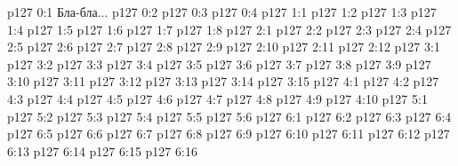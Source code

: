 \author{Промежуточные создания}
\vs p127 0:1  Бла-бла...
\vs p127 0:2 
\vs p127 0:3 
\vs p127 0:4 
\vs p127 1:1 
\vs p127 1:2 
\vs p127 1:3 
\vs p127 1:4 \pc 
\vs p127 1:5 \pc 
\vs p127 1:6 
\vs p127 1:7 
\vs p127 1:8 
\vs p127 2:1 
\vs p127 2:2 
\vs p127 2:3 
\vs p127 2:4 
\vs p127 2:5 
\vs p127 2:6 
\vs p127 2:7 
\vs p127 2:8 
\vs p127 2:9 
\vs p127 2:10 
\vs p127 2:11 \pc 
\vs p127 2:12 \pc 
{}
\vs p127 3:1 
\vs p127 3:2 
\vs p127 3:3 
\vs p127 3:4 
\vs p127 3:5 
\vs p127 3:6 
\vs p127 3:7 \pc 
\vs p127 3:8 
\vs p127 3:9 
\vs p127 3:10 
\vs p127 3:11 \pc 
\vs p127 3:12 
\vs p127 3:13 \pc 
\vs p127 3:14 
\vs p127 3:15 
\vs p127 4:1 
\vs p127 4:2 
\vs p127 4:3 
\vs p127 4:4 
\vs p127 4:5 
\vs p127 4:6 
\vs p127 4:7 
\vs p127 4:8 
\vs p127 4:9 \pc 
\vs p127 4:10 
\vs p127 5:1 
\vs p127 5:2 
\vs p127 5:3 
\vs p127 5:4 
\vs p127 5:5 
\vs p127 5:6 
\vs p127 6:1 
\vs p127 6:2 
\vs p127 6:3 \pc 
\vs p127 6:4 
\vs p127 6:5 
\vs p127 6:6 
\vs p127 6:7 
\vs p127 6:8 \pc 
\vs p127 6:9 
\vs p127 6:10 
\vs p127 6:11 
\vs p127 6:12 \pc 
\vs p127 6:13 \pc 
\vs p127 6:14 
\vs p127 6:15 
\vs p127 6:16 
\quizlink
